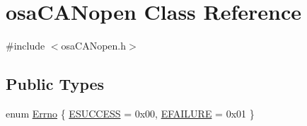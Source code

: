\hypertarget{classosa_c_a_nopen}{}\section{osa\+C\+A\+Nopen Class Reference}
\label{classosa_c_a_nopen}


{\ttfamily \#include $<$osa\+C\+A\+Nopen.\+h$>$}

\subsection*{Public Types}
\begin{DoxyCompactItemize}
\item 
enum \hyperlink{classosa_c_a_nopen_a5bf7839b2a382734c2f745e50ea7cfa0}{Errno} \{ \hyperlink{classosa_c_a_nopen_a5bf7839b2a382734c2f745e50ea7cfa0aa37f65c3e44df1d419cd94195bd39997}{E\+S\+U\+C\+C\+E\+S\+S} = 0x00, 
\hyperlink{classosa_c_a_nopen_a5bf7839b2a382734c2f745e50ea7cfa0a5627101253d1bf51ea8a3ae69dbd869e}{E\+F\+A\+I\+L\+U\+R\+E} = 0x01
 \}
\end{DoxyCompactItemize}
